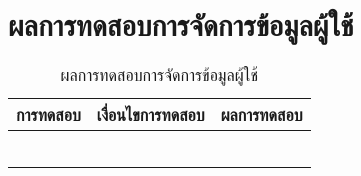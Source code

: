 \section{ผลการทดสอบการจัดการข้อมูลผู้ใช้}
\begin{table}[H]
	\caption{ผลการทดสอบการจัดการข้อมูลผู้ใช้}
    \centering	
	\label{tab:test3}
    \begin{tabular}{ | p{4cm} | p{4cm} | p{4cm}  | }
		\hline
	\multicolumn{1}{|c|}{การทดสอบ} & \multicolumn{1}{c|}{เงื่อนไขการทดสอบ} & \multicolumn{1}{c|}{ผลการทดสอบ}  \\ \hline
	\setstretch{1.0}{ทดสอบเพิ่มข้อมูลผู้ใช้}
	& \setstretch{1.0}{ผู้ใช้กรอกข้อมูลครบทุกช่อง และกดบันทึกข้อมูล}
	& \setstretch{1.0}{ระบบจะบันทึกข้อมูลลงฐานข้อมูล} \\ \cline{2-3} 
	& \setstretch{1.0}{ผู้ใช้กรอกขข้อมูลไม่ครบ และกดบันทึกข้อมูล} 
	& \setstretch{1.0}{ระบบจะแสดงข้อความว่า กรุณากรอกข้อมูลให้ถูกต้อง} \\  \hline
	\setstretch{1.0}{ทดสอบการแก้ไขข้อมูล}
	& \setstretch{1.0}{ผู้ใช้กรอกข้อมูลครบทุกช่อง และกดบันทึกข้อมูล}
	& \setstretch{1.0}{ระบบจะบันทึกข้อมูลลงฐานข้อมูล} \\ \cline{2-3} 
	& \setstretch{1.0}{ผู้ใช้กรอกขข้อมูลไม่ครบ และกดบันทึกข้อมูล} 
	& \setstretch{1.0}{ระบบจะแสดงข้อความว่า กรุณากรอกข้อมูลให้ถูกต้อง} \\  \hline
	\setstretch{1.0}{ทดสอบการเปลี่ยนรูปประจำตัว}
	& \setstretch{1.0}{เลือกรูปประจำตัวด้วยกล้องหรือเลือกจากแกลอรี่ และกดเปลี่ยนรูป}
	& \setstretch{1.0}{ระบบจะบันทึกรูปภาพและแสดงในหน้าจอ} \\ \cline{2-3} 
	& \setstretch{1.0}{ผู้ใช้ไม่เลือกรูปภาพ และกดเปลี่ยนรูป} 
	& \setstretch{1.0}{ระบบจะแสดงรูปพื้นฐานของระบบ} \\ \hline
    \end{tabular}
\end{table}

